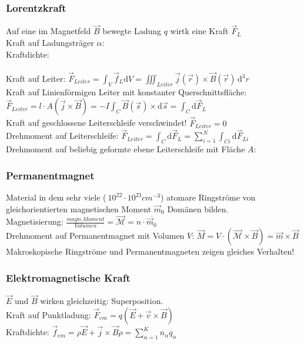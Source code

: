 \documentclass[10pt,a4paper]{scrartcl}
\begin{document}
\subsubsection{Lorentzkraft} %
Auf eine im Magnetfeld $\vec B$ bewegte Ladung $q$ wirtk eine Kraft $\vec F_L$\\
Kraft auf Ladungsträger $\alpha$: \\
Kraftdichte: \\
\\
Kraft auf Leiter: $\vec F_{Leiter}=\int_V \vec f_L \mathrm dV=\iiint_{Leiter} \vec j(\vec r)\times \vec B(\vec r)\, \mathrm d^3r$\\
Kraft auf Linienförmigen Leiter mit konstanter Querschnittsfläche: \\
$\vec F_{Leiter}=l\cdot A (\vec j\times \vec B)=-I\int_C \vec B(\vec s) \times \mathrm d \vec s=\int_C \mathrm d \vec F_L$\qquad {}\\
Kraft auf geschlossene Leiterschleife verschwindet!  $\vec F_{Leiter}=0$\\
Drehmoment auf Leiterschleife: $\vec F_{Leiter}=\int_C \mathrm d \vec F_L=\sum_{i=1}^N \int_{Ci} \mathrm d \vec F_{Li}$\\
Drehmoment auf beliebig geformte ebene Leiterschleife mit Fläche $A$: \\


\subsubsection{Permanentmagnet}
Material in dem sehr viele ($~10^{22}\cdot 10^{23} cm^{-3}$) atomare Ringströme von gleichorientierten magnetischen Moment $\vec m_0$ Domänen bilden.\\
Magnetisierung: $\frac{magn. Moment}{Volumen}=\vec{\mathcal M} =n \cdot {\overline{\vec m_0}}$\\
Drehmoment auf Permanentmagnet mit Volumen $V$: $\vec M = V\cdot (\vec {\mathcal{M}} \times \vec B)=\vec m \times \vec B$\\
Makroskopische Ringströme und Permanentmagneten zeigen gleiches Verhalten!\\
 
\subsubsection{Elektromagnetische Kraft}
$\vec E$ und $\vec B$ wirken gleichzeitig: Superposition.\\
Kraft auf Punktladung: $\vec F_{em}=q(\vec E + \vec v\times \vec B)$\\
Kraftdichte: $\vec f_{em}=\rho \vec E + \vec j \times \vec B$\qquad $\rho=\sum_{\alpha=1}^K n_\alpha q_\alpha$\\
\end{document}
